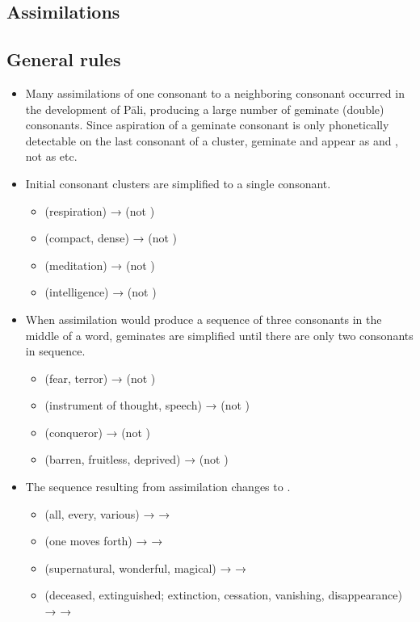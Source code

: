 \subsection{Assimilations}

\subsection*{General rules}

\begin{itemize}
	\item Many assimilations of one consonant to a neighboring consonant occurred in the development of Pāli, producing a large number of geminate (double) consonants. Since aspiration of a geminate consonant is only phonetically detectable on the last consonant of a cluster, geminate  and  appear as  and , not as  etc.
	\item Initial consonant clusters are simplified to a single consonant.
		\begin{itemize}
			\item {} (respiration) →  (not )
			\item {} (compact, dense) →  (not )
			\item {} (meditation) →  (not )
			\item {} (intelligence) →  (not )
		\end{itemize}
	\item When assimilation would produce a sequence of three consonants in the middle of a word, geminates are simplified until there are only two consonants in sequence.
		\begin{itemize}
			\item {} (fear, terror) →  (not )
			\item {} (instrument of thought, speech) →  (not )
			\item {} (conqueror) →  (not )
			\item {} (barren, fruitless, deprived) →  (not )
		\end{itemize}
	\item The sequence  resulting from assimilation changes to .
		\begin{itemize}
			\item {} (all, every, various) →  → 
			\item {} (one moves forth) →  → 
			\item {} (supernatural, wonderful, magical) →  → 
			\item {} (deceased, extinguished; extinction, cessation, vanishing, disappearance) →  → 
		\end{itemize}
\end{itemize}

